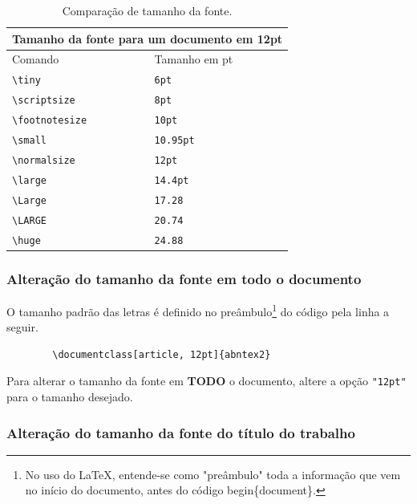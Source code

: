 \documentclass[
article,			%
12pt,				%
oneside,			%
a4paper,			%
english,			%
brazil,				%
sumario=tradicional
]{abntex2}
\begin{document}
    \begin{table}[h!]
    \begin{tabular}{ |p{5cm}||p{4cm}|}
 \hline
 \multicolumn{2}{|c|}{Tamanho da fonte para um documento em 12pt} \\
 \hline
 Comando & Tamanho em pt \\
 \hline
 \verb|\tiny | & \texttt{6pt} \\
 \verb|\scriptsize | & \texttt{8pt} \\
 \verb|\footnotesize | & \texttt{10pt} \\
 \verb|\small | & \texttt{10.95pt}  \\ \verb|\normalsize | & \texttt{12pt} \\ \verb|\large | & \texttt{14.4pt} \\ \verb|\Large| & \texttt{17.28} \\ \verb|\LARGE | & \texttt{20.74} \\ \verb|\huge| & \texttt{24.88}\\
 \hline
\end{tabular}
\caption{Comparação de tamanho da fonte.}
\label{Tabela 2}
\end{table}

    \subsubsection{Alteração do tamanho da fonte em todo o documento}
  
   O tamanho padrão das letras é definido no preâmbulo\footnote{No uso do \LaTeX, entende-se como "preâmbulo" toda a informação que vem no início do documento, antes do código begin\{document\}.} do código pela linha a seguir.

    \begin{verbatim}
        \documentclass[article, 12pt]{abntex2}
    \end{verbatim}

    Para alterar o tamanho da fonte em \textbf{TODO} o documento, altere a opção \texttt{"12pt"} para o tamanho desejado.
    
    \subsubsection{Alteração do tamanho da fonte do título do trabalho}
\end{document}
